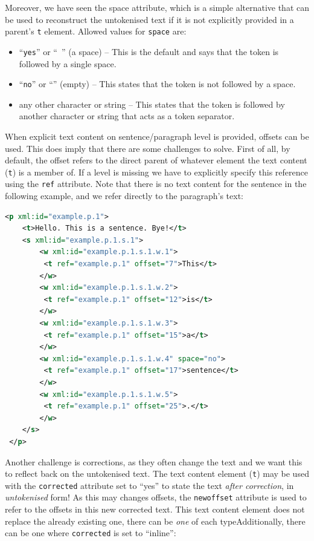 \documentclass[a4paper,12pt]{report}
\begin{document}
Moreover, we have seen the space attribute, which is a simple alternative that can be used to reconstruct the untokenised text if it is not explicitly provided in a parent's \texttt{t} element. Allowed values for \texttt{space} are:

\begin{itemize}
\item ``\texttt{yes}'' or ``\texttt{ }'' (a space) -- This is the default and says that the token is followed by a single space.
\item ``\texttt{no}'' or ``\texttt{}'' (empty) -- This states that the token is not followed by a space.
\item any other character or string -- This states that the token is followed by another character or string that acts as a token separator.
\end{itemize}

When explicit text content on sentence/paragraph level is provided, offsets can be used. This does imply that there are some challenges to solve. First of all, by default, the offset refers to the direct parent of whatever element the text content (\texttt{t}) is a member of. If a level is missing we have to explicitly specify this reference using the \texttt{ref} attribute. Note that there is no text content for the sentence in the following example, and we refer directly to the paragraph's text:

\begin{lstlisting}[language=xml]
 <p xml:id="example.p.1">
    <t>Hello. This is a sentence. Bye!</t>
    <s xml:id="example.p.1.s.1">        
        <w xml:id="example.p.1.s.1.w.1">
         <t ref="example.p.1" offset="7">This</t>
        </w>
        <w xml:id="example.p.1.s.1.w.2">
         <t ref="example.p.1" offset="12">is</t>
        </w>
        <w xml:id="example.p.1.s.1.w.3">
         <t ref="example.p.1" offset="15">a</t>
        </w>
        <w xml:id="example.p.1.s.1.w.4" space="no">
         <t ref="example.p.1" offset="17">sentence</t>
        </w>
        <w xml:id="example.p.1.s.1.w.5">
         <t ref="example.p.1" offset="25">.</t>
        </w>
    </s>
 </p>
\end{lstlisting}

Another challenge is corrections, as they often change the text and we want this to reflect back on the untokenised text. The text content element (\texttt{t}) may be used with the \texttt{corrected} attribute set to ``yes'' to state the text \emph{after correction}, in \emph{untokenised} form! As this may changes offsets, the \texttt{newoffset} attribute is used to refer to the offsets in this new corrected text. This text content element does not replace the already existing one, there can be \emph{one} of each type\footnotesize{Additionally, there can be one where \texttt{corrected} is set to ``inline''}:
\end{document}
